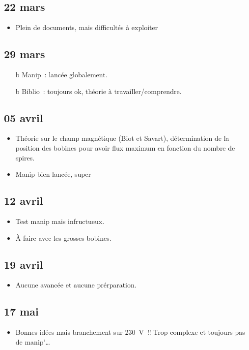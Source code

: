 \documentclass[a4paper, 11pt, final, garamond]{book}
\begin{document}
\subsection{22 mars}
\begin{itemize}
	\item Plein de documents, mais difficultés à exploiter
\end{itemize}

\subsection{29 mars}
\begin{itemize}
	\item[b]{Manip}~: lancée globalement.
	\item[b]{Biblio}~: toujours ok, théorie à travailler/comprendre.
\end{itemize}

\subsection{05 avril}
\begin{itemize}
	\item Théorie sur le champ magnétique (Biot et Savart), détermination de la
	      position des bobines pour avoir flux maximum en fonction du nombre de
	      spires.
	\item Manip bien lancée, super
\end{itemize}

\subsection{12 avril}
\begin{itemize}
	\item Test manip mais infructueux.
	\item À faire avec les grosses bobines.
\end{itemize}

\subsection{19 avril}
\begin{itemize}
	\item Aucune avancée et aucune prérparation.
\end{itemize}

\subsection{17 mai}
\begin{itemize}
	\item Bonnes idées mais branchement sur \SI{230}{V}~!! Trop complexe et
	      toujours pas de manip'…
\end{itemize}
\end{document}
